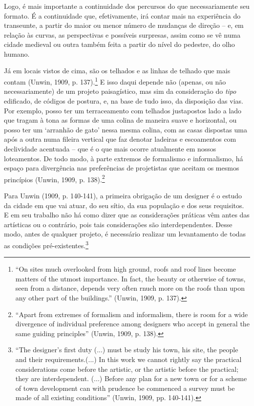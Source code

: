 \documentclass[12pt, a4paper]{book} %
\begin{document}
        Logo, é mais importante a continuidade dos percursos do que necessariamente seu formato. É a continuidade que, efetivamente, irá contar mais na experiência do transeunte, a partir do maior ou menor número de mudanças de direção – e, em relação às curvas, as perspectivas e possíveis surpresas, assim como se vê numa cidade medieval ou outra também feita a partir do nível do pedestre, do olho humano.

        Já em locais vistos de cima, são os telhados e as linhas de telhado que mais contam (Unwin, 1909, p. 137).\footnote[17]{``On sites much overlooked from high ground, roofs and roof lines become matters of the utmost importance. In fact, the beauty or otherwise of towns, seen from a distance, depends very often rnuch more on the roofs than upon any other part of the buildings.'' (Unwin, 1909, p. 137).} E isso daqui depende não (apenas, ou não necessariamente) de um projeto paisagístico, mas sim da consideração do \textit{tipo} edificado, de códigos de postura, e, na base de tudo isso, da disposição das vias. Por exemplo, posso ter um terraceamento com telhados justapostos lado a lado que tragam à tona as formas de uma colina de maneira suave e horizontal, ou posso ter um `arranhão de gato' nessa mesma colina, com as casas dispostas uma após a outra numa fileira vertical que faz denotar ladeiras e escoamentos com declividade acentuada – que é o que mais ocorre atualmente em nossos loteamentos. De todo modo, à parte extremos de formalismo e informalismo, há espaço para divergência nas preferências de projetistas que aceitam os mesmos princípios (Unwin, 1909, p. 138).\footnote[18]{``Apart from extremes of formalism and informalism, there is room for a wide divergence of individual preference among designers who accept in general the same guiding principles'' (Unwin, 1909, p. 138).}

        Para Unwin (1909, p. 140-141), a primeira obrigação de um designer é o estudo da cidade em que vai atuar, do seu sítio, da sua população e dos seus requisitos. E em seu trabalho não há como dizer que as considerações práticas vêm antes das artísticas ou o contrário, pois tais considerações são interdependentes. Desse modo, antes de qualquer projeto, é necessário realizar um levantamento de todas as condições pré-existentes.\footnote[19]{``The designer's first duty (...) must be study his town, his site, the people and their requirements.(...) In this work we cannot rightly say the practical considerations come before the artistic, or the artistic before the practical; they are interdependent. (...) Before any plan for a new town or for a scheme of town development can with prudence be commenced a survey must be made of all existing conditions'' (Unwin, 1909, pp. 140-141).}
\end{document}
